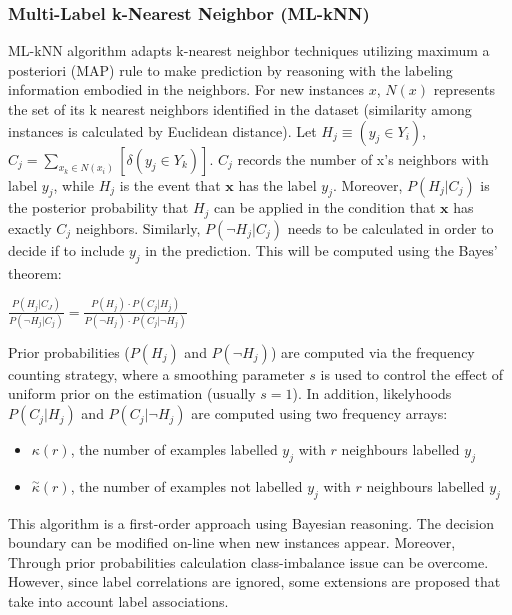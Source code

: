 \documentclass[12pt]{report}
\begin{document}
	\subsubsection*{Multi-Label k-Nearest Neighbor (ML-kNN)}
	ML-kNN algorithm adapts k-nearest neighbor techniques utilizing maximum a posteriori (MAP) rule to make prediction by reasoning with the labeling information embodied in the neighbors. For new instances $x$, $N(x)$ represents the set of its k nearest neighbors identified in the dataset (similarity among instances is calculated by Euclidean distance). Let $H_j \equiv (y_j \in Y_i)$, $C_j = \sum_{x_k \in N(x_i)} [\delta(y_j \in Y_k)]$. $C_j$ records the number of x’s neighbors with label $y_j$, while $H_j$ is the event that $\textbf{x}$ has the label $y_j$. Moreover, $P(H_j|C_j)$ is the posterior probability that $H_j$ can be applied in the condition that $\textbf{x}$ has exactly $C_j$ neighbors. Similarly, $P(\neg H_j|C_j)$ needs to be calculated in order to decide if to include $y_j$ in the prediction. This will be computed using the Bayes' theorem:
	
	\begin{center}
		$\frac{P(H_j|C_J)}{P(\neg H_j|C_j)} = \frac{P(H_j) \cdot P(C_j|H_j)}{P(\neg H_j) \cdot P(C_j| \neg H_j)}$
	\end{center}

	Prior probabilities ($P(H_j)$ and $P(\neg H_j)$) are computed via the frequency counting strategy, where a smoothing parameter $s$ is used to control the effect of uniform prior on the estimation (usually $s=1$). In addition, likelyhoods $P(C_j|H_j)$ and $P(C_j| \neg H_j)$ are computed using two frequency arrays:
	\begin{itemize}
		\item $\kappa(r)$, the number of examples labelled $y_j$ with $r$ neighbours labelled $y_j$
		\item $\overset{\sim}{\kappa}(r)$, the number of examples not labelled $y_j$ with $r$ neighbours labelled $y_j$
	\end{itemize}
	 
	This algorithm is a first-order approach using Bayesian reasoning. The decision boundary can be modified on-line when new instances appear. Moreover, Through prior probabilities calculation class-imbalance issue can be overcome. However, since label correlations are ignored, some extensions are proposed that take into account label associations.
	
\end{document}
